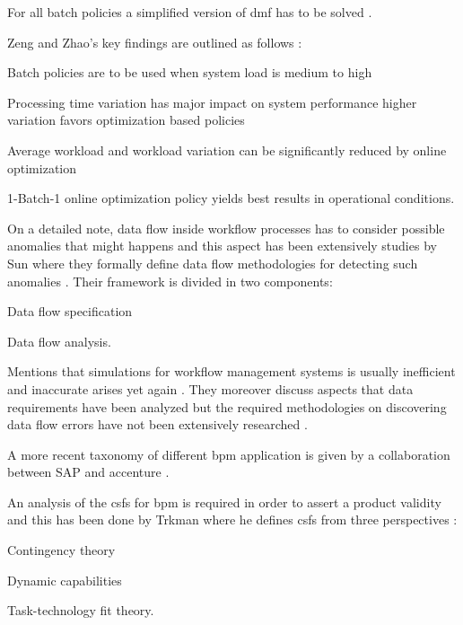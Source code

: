 \documentclass{seal_thesis}
\begin{document}
For all batch policies a simplified version of \gls{dmf} has to be solved \cite{Zeng2005}.

Zeng and Zhao's key findings are outlined as follows \cite{Zeng2005}:
\begin{enumerate*}
	\item Batch policies are to be used when system load is medium to high
	\item Processing time variation has major impact on system performance \ie higher variation favors optimization based policies
	\item Average workload and workload variation can be significantly reduced by online optimization
	\item 1-Batch-1 online optimization policy yields best results in operational conditions.
\end{enumerate*}

On a detailed note, data flow inside workflow processes has to consider possible anomalies that might happens and this aspect has been extensively studies by Sun \etal where they formally define data flow methodologies for detecting such anomalies \cite{Sun2006}. Their framework is divided in two components:
\begin{enumerate*}
	\item Data flow specification
	\item Data flow analysis.
\end{enumerate*}

Mentions that simulations for workflow management systems is usually inefficient and inaccurate arises yet again \cite{Sun2006}. They moreover discuss aspects that data requirements have been analyzed but the required methodologies on discovering data flow errors have not been extensively researched \cite{Sun2006}.

A more recent taxonomy of different \gls{bpm} application is given by a collaboration between SAP and accenture \cite{EvolvedTechnologist2009}.

An analysis of the \glspl{csf} for \gls{bpm} is required in order to assert a product validity and this has been done by Trkman where he defines \glspl{csf} from three perspectives \cite{Trkman2010}:
\begin{enumerate*}
	\item Contingency theory
	\item Dynamic capabilities
	\item Task-technology fit theory.
\end{enumerate*}
\end{document}
